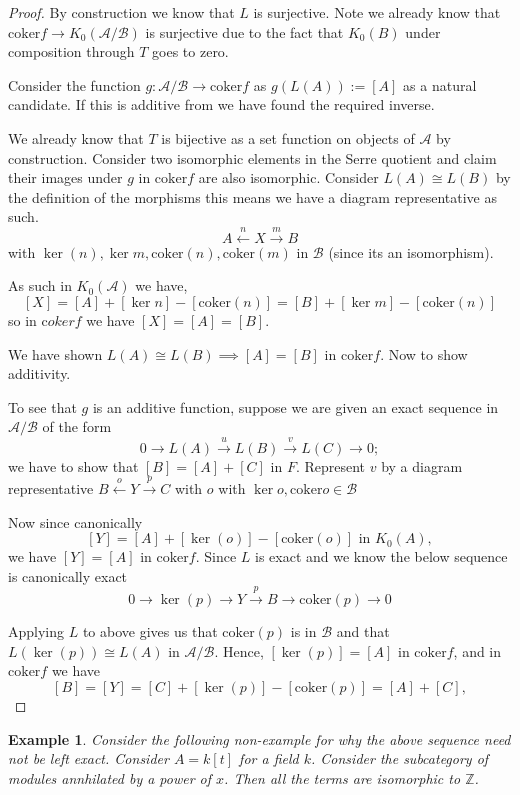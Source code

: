 \documentclass[12pt]{report}
\numberwithin{equation}{section}
\newcommand{\coker}{{\mathrm{coker}}}
\newtheorem{example}[dummy]{Example}
\begin{document}
	\begin{proof}
		By construction we know that $L$ is surjective.
		Note we already know that $\mathrm{coker} f \to  K_0(\mathcal{A/B})$ is surjective due to the fact that $K_0(B) $ under composition through $T$ goes to zero.
		
		Consider the function $g:\mathcal{A/B} \to \mathrm{coker}f$ as $g(L(A)):=[A]$ as a natural candidate. If this is additive from we have found the required inverse.
		
		We already know that $T $ is bijective as a set function on objects of $\mathcal{A}$ by construction. Consider two isomorphic elements in the Serre quotient and claim their images under $g$ in $\mathrm{coker} f $ are also isomorphic. Consider $L(A) \cong L(B)$ by the definition of the morphisms this means we have a diagram representative as such.
		\[ A \xleftarrow{n} X \xrightarrow{m} B \] with $\ker(n), \ker{m}, \mathrm{coker} (n) , \mathrm{coker}(m)$ in $\mathcal{B}$ (since its an isomorphism).
		
		As such in $K_0(\mathcal{A})$ we have, $$[X]=[A]+[\ker n]-[\mathrm{coker}(n)]=[B]+[\ker m]- [\mathrm{coker}(n)]$$ so in $\mathrm coker f$ we have $[X] = [A]=[B]$.
		
		We have shown $L(A) \cong L(B) \implies [A]=[B]$ in $\mathrm{coker} f$. Now to show additivity.
		
		To see that \( g \) is an additive function, suppose we are given an exact sequence in \( \mathcal{A/B} \) of the form
		\[
		0 \rightarrow L(A) \xrightarrow{u	} L(B) \xrightarrow{v} L(C) \rightarrow 0;
		\]
		we have to show that \( [B] = [A] + [C] \) in \( F \). Represent \( v \) by a diagram representative \( B \xleftarrow{o} Y \xrightarrow{p}	 C \) with \( o \) with $\ker o , \coker o \in \mathcal{B}$
		
		Now since canonically
		\[
		[Y] = [A] + [\ker(o)] - [\coker(o)] \text{ in } K_0(A),
		\]
		we have \( [Y] = [A] \) in \( \coker f \). Since \( L \) is exact and we know the below sequence is canonically exact
		\[
		0 \rightarrow \ker(p) \rightarrow Y \xrightarrow{p} B \rightarrow \coker(p) \rightarrow 0	\]
		
		Applying $L $ to above gives us that \( \coker(p) \) is in \( \mathcal B \) and that \( L(\ker(p)) \cong L(A) \) in \( \mathcal{A/B} \). Hence, \( [\ker(p)] = [A] \) in \( \coker f \), and in \( \coker f \) we have
		\[
		[B] = [Y] = [C] + [\ker(p)] - [\coker(p)] = [A] + [C],
		\]
	\end{proof}
	\begin{example}
		Consider the following non-example for why the above sequence need not be left exact.
		Consider $A=k[t]$ for a field $k$. Consider the subcategory of modules annhilated by a power of $x$. Then all the terms are isomorphic to $\mathbb{Z}$.
	\end{example}
\end{document}
